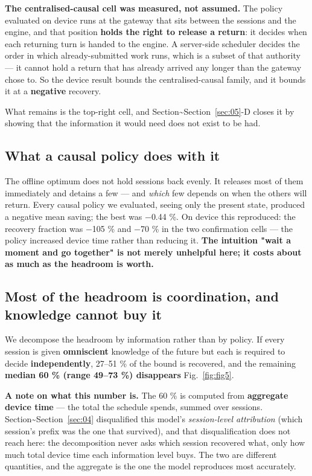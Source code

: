 \textbf{The centralised-causal cell was measured, not assumed.} The policy evaluated on device runs at the gateway that sits between the sessions and the engine, and that position \textbf{holds the right to release a return}: it decides when each returning turn is handed to the engine. A server-side scheduler decides the order in which already-submitted work runs, which is a subset of that authority --- it cannot hold a return that has already arrived any longer than the gateway chose to. So the device result bounds the centralised-causal family, and it bounds it at a \textbf{negative} recovery.

What remains is the top-right cell, and Section\textasciitilde{}Section~\ref{sec:05}-D closes it by showing that the information it would need does not exist to be had.

\subsection{What a causal policy does with it}

The offline optimum does not hold sessions back evenly. It releases most of them immediately and detains a few --- and \emph{which} few depends on when the others will return. Every causal policy we evaluated, seeing only the present state, produced a negative mean saving; the best was $-$0.44 \%. On device this reproduced: the recovery fraction was $-$105 \% and $-$70 \% in the two confirmation cells --- the policy increased device time rather than reducing it. \textbf{The intuition "wait a moment and go together" is not merely unhelpful here; it costs about as much as the headroom is worth.}

\subsection{Most of the headroom is coordination, and knowledge cannot buy it}

We decompose the headroom by information rather than by policy. If every session is given \textbf{omniscient} knowledge of the future but each is required to decide \textbf{independently}, 27--51 \% of the bound is recovered, and the remaining \textbf{median 60 \% (range 49--73 \%) disappears} Fig.~\ref{fig:fig5}.

\textbf{A note on what this number is.} The 60 \% is computed from \textbf{aggregate device time} --- the total the schedule spends, summed over sessions. Section\textasciitilde{}Section~\ref{sec:04} disqualified this model's \emph{session-level attribution} (which session's prefix was the one that survived), and that disqualification does not reach here: the decomposition never asks which session recovered what, only how much total device time each information level buys. The two are different quantities, and the aggregate is the one the model reproduces most accurately.

